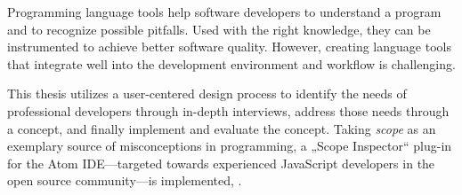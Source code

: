 Programming language tools help software developers to understand a
program and to recognize possible pitfalls. Used with the right
knowledge, they can be instrumented to achieve better software quality.
However, creating language tools that integrate well into the
development environment and workflow is challenging.

This thesis utilizes a user-centered design process to identify the
needs of professional developers through in-depth interviews, address
those needs through a concept, and finally implement and evaluate the
concept. Taking \emph{scope} as an exemplary source of misconceptions in
programming, a „Scope Inspector“ plug-in for the Atom IDE—targeted
towards experienced JavaScript developers in the open source
community—is implemented, .
